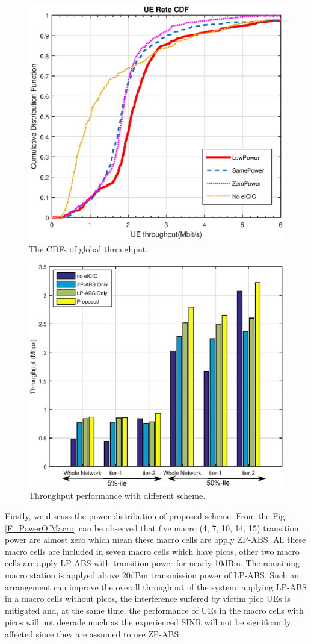 \documentclass[journal]{IEEETran}
\begin{document}
\begin{figure}[htpb]
\centering
\includegraphics[width=.5\textwidth]{CumulativeDistributionFunction.eps}
\caption{The CDFs of global throughput.}
\label{F_ThroughputCDFs}
\end{figure}


\begin{figure}[htpb]
\centering
\includegraphics[width=.5\textwidth]{DetailedThroughputPerformance.eps}
\caption{Throughput performance with different scheme.}
\label{F_DetailedThroughput}
\end{figure}

Firstly, we discuss the power distribution of proposed scheme. From the Fig.\ref{F_PowerOfMacro} can be observed that five macro (4, 7, 10, 14, 15) transition power are almost zero which mean these macro cells are apply ZP-ABS. All these macro cells are included in seven macro cells which have picos, other two macro cells are apply LP-ABS with transition power for nearly 10dBm. The remaining macro station is applyed above 20dBm transmission power of LP-ABS. Such an arrangement can improve the overall throughput of the system, applying LP-ABS in a macro cells without picos, the interference suffered by victim pico UEs is mitigated and, at the same time, the performance of UEs in the macro cells with picos will not degrade much as the experienced SINR will not be significantly affected since they are assumed to use ZP-ABS.
\end{document}
